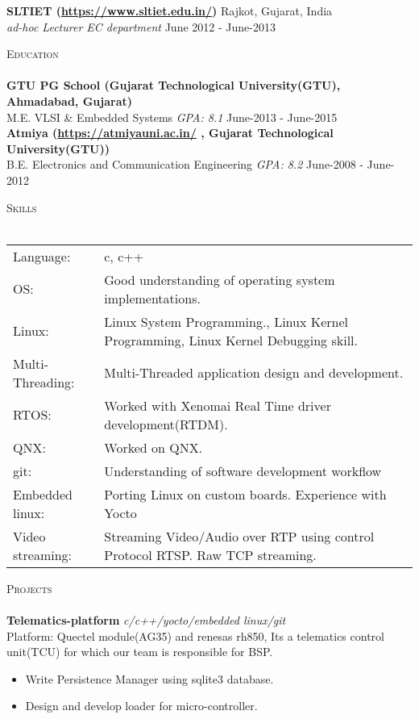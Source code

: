 \documentclass[a4paper]{article}
\newcommand{\lineunder} {
    \vspace*{-8pt} \\
    \hspace*{-18pt} \hrulefill \\
}
\newcommand{\header} [1] {
    {\hspace*{-18pt}\vspace*{6pt} \textsc{#1}}
    \vspace*{-6pt} \lineunder
}
\begin{document}
\textbf{SLTIET (\url{https://www.sltiet.edu.in/})} \hfill Rajkot, Gujarat, India\\
\textit{ad-hoc Lecturer EC department} \hfill June 2012 - June-2013 \\
\vspace{2mm}

\header{Education}
\textbf{GTU PG School (Gujarat Technological University(GTU), Ahmadabad, Gujarat)}\\
M.E. VLSI \& Embedded Systems \textit{GPA: 8.1} \hfill June-2013 - June-2015\\
\vspace{2mm}
\textbf{Atmiya (\url{https://atmiyauni.ac.in/} , Gujarat Technological University(GTU))}\\
B.E. Electronics and Communication Engineering \textit{GPA: 8.2} \hfill June-2008 - June-2012\\
\vspace{2mm}

\header{Skills}
\begin{tabular}{ l l }
	Language:        & c, c++                                                                             \\
	OS:              & Good understanding of operating system implementations.                            \\
	Linux:           & Linux System Programming., Linux Kernel Programming, Linux Kernel Debugging skill. \\
	Multi-Threading: & Multi-Threaded application design and development.                                 \\
	RTOS:            & Worked with Xenomai Real Time driver development(RTDM).                            \\
	QNX:			  & Worked on QNX. \\
	git:             & Understanding of software development workflow                                     \\
	Embedded linux:  & Porting Linux on custom boards. Experience with Yocto                              \\
	Video streaming: & Streaming Video/Audio over RTP using control Protocol RTSP. Raw TCP streaming.     \\
\end{tabular}
\vspace{2mm}

\header{Projects}
{\textbf{Telematics-platform}} {\sl c/c++/yocto/embedded linux/git} \\
Platform: Quectel module(AG35) and renesas rh850, Its a telematics control unit(TCU) for which our team is responsible for BSP.\\ 
\begin{itemize} \itemsep 0.5pt
\item Write Persistence Manager using sqlite3 database.
\item Design and develop loader for micro-controller.
\end{itemize}
\vspace*{2mm}
\end{document}
